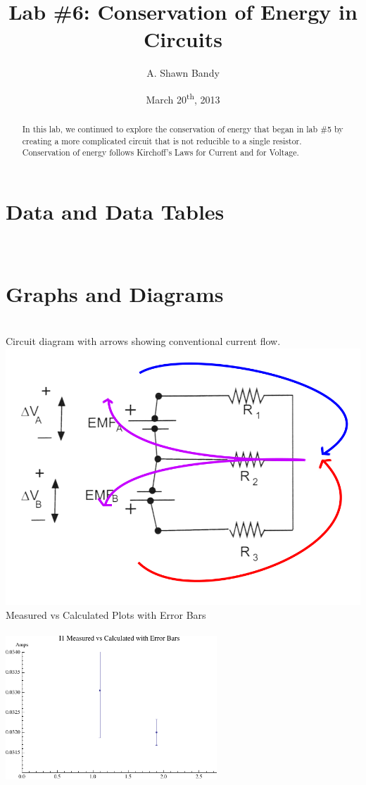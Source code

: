 \documentclass{article}
\begin{document}
\title{Lab \#6:  Conservation of Energy in Circuits}
\author{A. Shawn Bandy}
\date{March 20\textsuperscript{th}, 2013}
\maketitle
\begin{abstract}
In this lab, we continued to explore the conservation of energy that began in lab \#5 by creating a more complicated circuit that is not reducible to a single resistor.  Conservation of energy follows Kirchoff's Laws for Current and for Voltage.
\end{abstract}
\begingroup
	\section{Data and Data Tables}\hfill\\
		\let\clearpage\relax
			\begin{enumerate}[A.]
			
			
			
			
			\end{enumerate}
\endgroup
\begingroup
	\section{Graphs and Diagrams}\hfill\\
			Circuit diagram with arrows showing conventional current flow.\\
			\includegraphics{phys152_lab7_circuitdiagram}\\
			
			Measured vs Calculated Plots with Error Bars \\\\
			\includegraphics[width=300px]{lab7_graph1} \\
			
\end{document}
